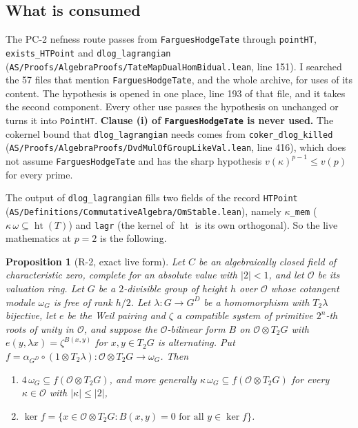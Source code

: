 \documentclass[11pt]{article}
\newcommand{\lean}[1]{\nolinkurl{#1}}
\newtheorem{proposition}[theorem]{Proposition}
\theoremstyle{definition}
\theoremstyle{remark}
\newcommand{\cO}{\mathcal O}
\begin{document}
\subsection{What is consumed}

The PC-2 nefness route passes from \lean{FarguesHodgeTate} through \lean{pointHT}, \lean{exists_HTPoint} and \lean{dlog_lagrangian} (\texttt{AS/Proofs/AlgebraProofs/TateMapDualHomBidual.lean}, line 151). I searched the 57 files that mention \lean{FarguesHodgeTate}, and the whole archive, for uses of its content. The hypothesis is opened in one place, line 193 of that file, and it takes the second component. Every other use passes the hypothesis on unchanged or turns it into \lean{PointHT}. \textbf{Clause (i) of \lean{FarguesHodgeTate} is never used.} The cokernel bound that \lean{dlog_lagrangian} needs comes from \lean{coker_dlog_killed} (\texttt{AS/Proofs/AlgebraProofs/DvdMulOfGroupLikeVal.lean}, line 416), which does not assume \lean{FarguesHodgeTate} and has the sharp hypothesis $v(\kappa)^{p-1}\le v(p)$ for every prime.

The output of \lean{dlog_lagrangian} fills two fields of the record \lean{HTPoint} (\texttt{AS/Definitions/CommutativeAlgebra/OmStable.lean}), namely $\kappa$\texttt{\_mem} ($\kappa\,\omega\subseteq\operatorname{ht}(T)$) and \lean{lagr} (the kernel of $\operatorname{ht}$ is its own orthogonal). So the live mathematics at $p=2$ is the following.

\begin{proposition}[R-2, exact live form]\label{prop:live}
Let $C$ be an algebraically closed field of characteristic zero, complete for an absolute value with $\lvert2\rvert<1$, and let $\cO$ be its valuation ring. Let $G$ be a $2$-divisible group of height $h$ over $\cO$ whose cotangent module $\omega_G$ is free of rank $h/2$. Let $\lambda\colon G\to G^D$ be a homomorphism with $T_2\lambda$ bijective, let $e$ be the Weil pairing and $\zeta$ a compatible system of primitive $2^n$-th roots of unity in $\cO$, and suppose the $\cO$-bilinear form $B$ on $\cO\otimes T_2G$ with $e(y,\lambda x)=\zeta^{B(x,y)}$ for $x,y\in T_2G$ is alternating. Put $f=\alpha_{G^D}\circ(1\otimes T_2\lambda)\colon\cO\otimes T_2G\to\omega_G$. Then
\begin{enumerate}[label=(\roman*),nosep]
\item $4\,\omega_G\subseteq f(\cO\otimes T_2G)$, and more generally $\kappa\,\omega_G\subseteq f(\cO\otimes T_2G)$ for every $\kappa\in\cO$ with $\lvert\kappa\rvert\le\lvert2\rvert$,
\item $\ker f=\{x\in\cO\otimes T_2G : B(x,y)=0\text{ for all }y\in\ker f\}$.
\end{enumerate}
\end{proposition}
\end{document}
